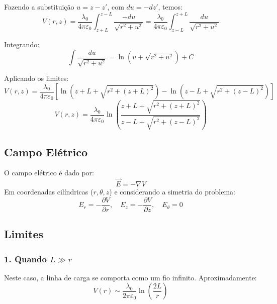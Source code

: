 \documentclass[a4paper,12pt]{article}
\begin{document}
Fazendo a substituição \( u = z - z' \), com \( du = -dz' \), temos:
\begin{equation}
V(r,z) = \frac{\lambda_0}{4\pi\varepsilon_0} \int_{z+L}^{z-L} \frac{-du}{\sqrt{r^2 + u^2}} = \frac{\lambda_0}{4\pi\varepsilon_0} \int_{z-L}^{z+L} \frac{du}{\sqrt{r^2 + u^2}}
\end{equation}

Integrando:
\begin{equation}
\int \frac{du}{\sqrt{r^2 + u^2}} = \ln\left(u + \sqrt{r^2 + u^2}\right) + C
\end{equation}

Aplicando os limites:
\begin{equation}
V(r,z) = \frac{\lambda_0}{4\pi\varepsilon_0} \left[ \ln\left(z+L + \sqrt{r^2 + (z+L)^2}\right) - \ln\left(z-L + \sqrt{r^2 + (z-L)^2}\right) \right]
\end{equation}
\begin{equation}
\boxed{
V(r,z) = \frac{\lambda_0}{4\pi\varepsilon_0} \ln\left( \frac{z+L + \sqrt{r^2 + (z+L)^2}}{z-L + \sqrt{r^2 + (z-L)^2}} \right)
}
\end{equation}

\subsection*{Campo Elétrico}

O campo elétrico é dado por:
\begin{equation}
\vec{E} = -\nabla V
\end{equation}
Em coordenadas cilíndricas (\( r, \theta, z \)) e considerando a simetria do problema:
\begin{equation}
E_r = -\frac{\partial V}{\partial r}, \quad E_z = -\frac{\partial V}{\partial z}, \quad E_\theta = 0
\end{equation}

\subsection*{Limites}

\subsubsection*{1. Quando \( L \gg r \)}

Neste caso, a linha de carga se comporta como um fio infinito. Aproximadamente:
\begin{equation}
\boxed{
V(r) \sim \frac{\lambda_0}{2\pi\varepsilon_0} \ln\left(\frac{2L}{r}\right)
}
\end{equation}
\end{document}
